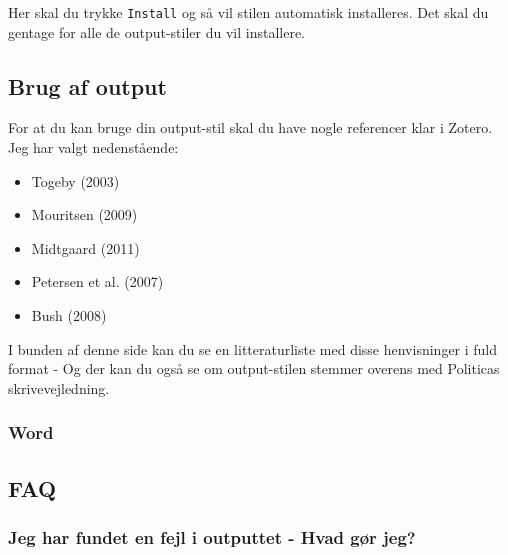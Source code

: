 \documentclass[
  a4paper,
  DIV=11,
  numbers=noendperiod,
  oneside]{scrartcl}
\providecommand{\tightlist}{%
  \setlength{\itemsep}{0pt}\setlength{\parskip}{0pt}}\usepackage{longtable,booktabs,array}
\begin{document}
Her skal du trykke \texttt{Install} og så vil stilen automatisk
installeres. Det skal du gentage for alle de output-stiler du vil
installere.


\subsection{Brug af output}\label{brug-af-output}

For at du kan bruge din output-stil skal du have nogle referencer klar i
Zotero. Jeg har valgt nedenstående:

\begin{itemize}
\tightlist
\item
  Togeby (2003)
\item
  Mouritsen (2009)
\item
  Midtgaard (2011)
\item
  Petersen et al. (2007)
\item
  Bush (2008)
\end{itemize}

I bunden af denne side kan du se en litteraturliste med disse
henvisninger i fuld format - Og der kan du også se om output-stilen
stemmer overens med Politicas skrivevejledning.

\subsubsection{Word}\label{word}

\subsection{FAQ}\label{faq}

\subsubsection{Jeg har fundet en fejl i outputtet - Hvad gør
jeg?}\label{jeg-har-fundet-en-fejl-i-outputtet---hvad-guxf8r-jeg}
\end{document}
